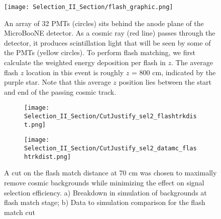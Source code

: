\begin{figure}[H]
\centering
    \centering
\texttt{[image: Selection\_II\_Section/flash\_graphic.png]}
\caption{ An array of 32 PMTs (circles) sits behind the anode plane of the MicroBooNE detector. As a cosmic ray (red line) passes through the detector, it produces scintillation light that will be seen by some of the PMTs (yellow circles). To perform flash matching, we first calculate the weighted energy deposition per flash in $z$.  The average flash $z$ location in this event is roughly $z$ = 800 cm, indicated by the purple star. Note that this average $z$ position lies between the start and end of the passing cosmic track. } 
\label{fig:flash_graphic}
\end{figure}



\begin{figure}[H]
  \begin{subfigure}[t]{0.4\textwidth}
\texttt{[image: Selection\_II\_Section/CutJustify\_sel2\_flashtrkdist.png]}
    \caption{ }
  \end{subfigure} 
  \hspace{10 mm}
  \begin{subfigure}[t]{0.4\textwidth}
\texttt{[image: Selection\_II\_Section/CutJustify\_sel2\_datamc\_flashtrkdist.png]}
    \caption{ }
  \end{subfigure} 
\caption{ A cut on the flash match distance at 70 cm was chosen to maximally remove cosmic backgrounds while minimizing the effect on signal selection efficiency. a) Breakdown in simulation of backgrounds at flash match stage; b) Data to simulation comparison for the flash match cut }
\label{fig:cutjust_sel2_flashtrkdist}
\end{figure}


